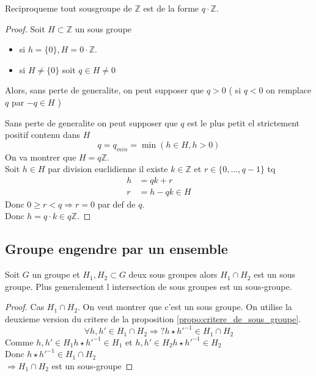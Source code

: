 \documentclass[../main.tex]{subfiles}
\begin{document}
\begin{thm}\label{thm:sous_groupe_de_mathbb_z_}
Reciproqueme tout sousgroupe de $\mathbb{Z}$ est de la forme $q\cdot \mathbb{Z}$.
\end{thm}
\begin{proof}
Soit $H \subset \mathbb{Z}$ un sous groupe
\begin{itemize}
	\item si $h=\{0\}, H = 0\cdot \mathbb{Z}$.\\
	\item si $H\neq \{0\}$ soit $q\in H \neq 0$
\end{itemize}
Alors, sans perte de generalite, on peut supposer que $q>0$ ( si $q<0$ on remplace $q$ par $-q \in H$ )

Sans perte de generalite on peut supposer que $q$ est le plus petit el strictement positif contenu dans $H$ 
\[ 
	q=q_{min}=\min(h\in H, h>0)
\]
On va montrer que $H=q\mathbb{Z}$.\\
Soit $h\in H$ par division euclidienne il existe $k\in \mathbb{Z}$  et $r\in \{0,\ldots,q-1\}$ tq
\begin{align*}
	h&=qk+r\\
r&=h-qk \in H 
\end{align*}
Donc $0 \geq r < q \Rightarrow r=0$ par def de $q$.\\
Donc $h=q\cdot k \in q\mathbb{Z}$.

\end{proof}

\subsection{Groupe engendre par un ensemble}
\begin{propo}\label{propo:intersection_de_sous_groupes}
	Soit $G$ un groupe et $H_1, H_2 \subset G$ deux sous groupes alors $ H_1\cap H_2$ est un sous groupe.
	Plus generalement l intersection de sous groupes est un sous-groupe.
\end{propo}
\begin{proof}
Cas $ H_1 \cap H_2$.
On veut montrer que c'est un sous groupe. On utilise la deuxieme version du critere de la proposition \ref{propo:critere_de_sous_groupe}.
\[ 
\forall h,h' \in H_1\cap H_2 \Rightarrow ? h\star h'^{-1} \in H_1\cap H_2
\]
Comme $h,h' \in H_1 h\star h'^{-1}\in H_1$ et
$h,h' \in  H_2 h \star h'^{-1} \in H_2$\\
Donc $h\star h'^{-1}\in H_1 \cap H_2$\\
$  \Rightarrow H_1 \cap H_2$ est un sous-groupe
\end{proof}
\end{document}
